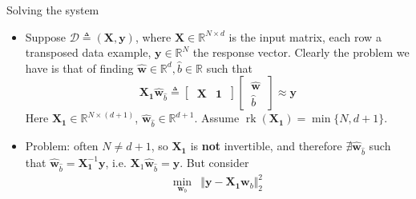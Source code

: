 \documentclass{beamer}
\numberwithin{equation}{section}
\begin{document}
\begin{frame}{Solving the system}
    \begin{itemize}
        \item
        Suppose $ \mathcal{D} \triangleq (\mathbf{X}, \mathbf{y}) $, where
        $ \mathbf{X} \in \mathbb{R}^{N \times d} $ is the input matrix, each
        row a transposed data example, $ \mathbf{y} \in \mathbb{R}^N $ the
        response vector. Clearly the problem we have is that of finding
        $ \hat{\mathbf{w}} \in \mathbb{R}^d , \hat{b} \in \mathbb{R} $
        such that
        \begin{equation*}
            \mathbf{X}_\mathbf{1}\hat{\mathbf{w}}_{\hat{b}} \triangleq
            \begin{bmatrix}
                \ \mathbf{X} & \mathbf{1} \
            \end{bmatrix}
            \begin{bmatrix}
                \ \hat{\mathbf{w}} \ \\ \ \hat{b} \
            \end{bmatrix} \approx \mathbf{y}
        \end{equation*}
        Here $ \mathbf{X}_\mathbf{1} \in \mathbb{R}^{N \times (d + 1)} $,
        $ \hat{\mathbf{w}}_{\hat{b}} \in \mathbb{R}^{d + 1} $. Assume
        $ \operatorname{rk}(\mathbf{X}_\mathbf{1}) = \min\{N, d + 1\} $.

        \item
        Problem: often $ N \ne d + 1 $, so $ \mathbf{X}_\mathbf{1} $ is
        \textbf{not} invertible, and therefore $ \nexists
        \hat{\mathbf{w}}_{\hat{b}} $ such that $ \hat{\mathbf{w}}_{\hat{b}} =
        \mathbf{X}_\mathbf{1}^{-1}\mathbf{y} $, i.e. $ \mathbf{X}_1
        \hat{\mathbf{w}}_{\hat{b}} = \mathbf{y} $. But consider
        \begin{equation} \label{lr_obj_aug}
            \begin{array}{ll}
                \displaystyle\min_{\mathbf{w}_b} &
                \Vert\mathbf{y} - \mathbf{X}_\mathbf{1}\mathbf{w}_b\Vert_2^2
            \end{array}
        \end{equation}
    \end{itemize}
\end{frame}
\end{document}
